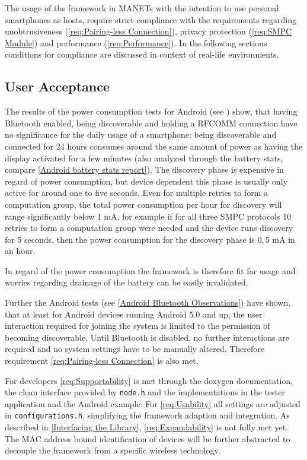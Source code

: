 The usage of the framework in \glspl{MANET} with the intention to use personal smartphones as hosts, require strict compliance with the requirements regarding unobtrusiveness (\ref{req:Pairing-less Connection}), privacy protection (\ref{req:SMPC Module}) and performance (\ref{req:Performance}). In the following sections conditions for compliance are discussed in context of real-life environments.

\subsection{User Acceptance}
The results of the power consumption tests for Android (see ) show, that having Bluetooth enabled, being discoverable and holding a \gls{RFCOMM} connection have no significance for the daily usage of a smartphone: being discoverable and connected for 24 hours consumes around the same amount of power as having the display activated for a few minutes (also analyzed through the battery stats, compare \autoref{Android battery stats report}). 
The discovery phase is expensive in regard of power consumption, but device dependent this phase is usually only active for around one to five seconds. Even for multiple retries to form a computation group, the total power consumption per hour for discovery will range significantly below 1 mA, for example if for all three \gls{SMPC} protocols 10 retries to form a computation group were needed and the device runs discovery for 5 seconds, then the power consumption for the discovery phase is $0,5$ mA in an hour. 

In regard of the power consumption the framework is therefore fit for usage and worries regarding drainage of the battery can be easily invalidated.

Further the Android tests (see \autoref{Android Bluetooth Observations}) have shown, that at least for Android devices running Android 5.0 and up, the user interaction required for joining the system is limited to the permission of becoming discoverable. Until Bluetooth is disabled, no further interactions are required and no system settings have to be manually altered. Therefore requirement \ref{req:Pairing-less Connection} is also met.

For developers \ref{req:Supportability} is met through the doxygen documentation, the clean interface provided by \lstinline|node.h| and the implementations in the tester application and the Android example. For \ref{req:Usability} all settings are adjusted in \lstinline|configurations.h|, simplifying the framework adaption and integration. 
As described in \autoref{Interfacing the Library}, \ref{req:Expandability} is not fully met yet. The \gls{MAC} address bound identification of devices will be further abstracted to decouple the framework from a specific wireless technology.

